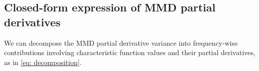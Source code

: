 \documentclass{article}
\theoremstyle{plain}
\newtheorem{theorem}{Theorem}[section]
\theoremstyle{definition}
\newtheorem{assumption}[theorem]{Assumption}
\theoremstyle{remark}
\begin{document}
\subsection{Closed-form expression of MMD partial derivatives}
\label{subsec:mmd}
We can decompose the MMD partial derivative variance into frequency-wise contributions involving characteristic function values and their partial derivatives, as in \cref{eq: decomposition}. 
\end{document}
